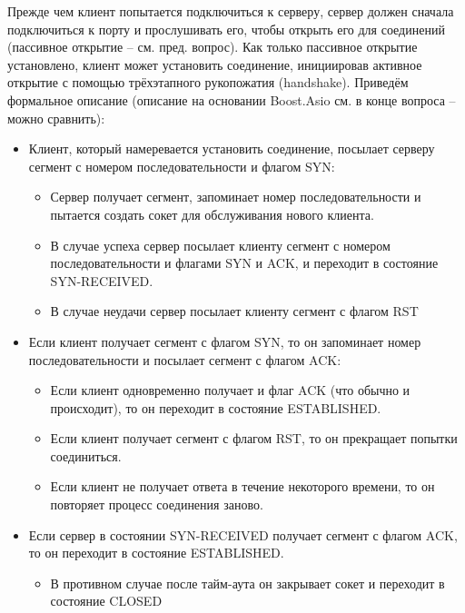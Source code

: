 \documentclass[a4paper,12pt]{article}	%
\begin{document}
	Прежде чем клиент попытается подключиться к серверу, сервер должен сначала подключиться к порту и прослушивать его, чтобы открыть его для соединений (пассивное открытие -- см. пред. вопрос). Как только пассивное открытие установлено, клиент может установить соединение, инициировав активное открытие с помощью трёхэтапного рукопожатия (handshake). Приведём формальное описание (описание на основании Boost.Asio см. в конце вопроса -- можно сравнить):
	
	\begin{itemize}
	
		\item Клиент, который намеревается установить соединение, посылает серверу сегмент с номером последовательности и флагом SYN:
		
		\begin{itemize}
		
			\item Сервер получает сегмент, запоминает номер последовательности и пытается создать сокет для обслуживания нового клиента.
			
			\item В случае успеха сервер посылает клиенту сегмент с номером последовательности и флагами SYN и ACK, и переходит в состояние SYN-RECEIVED.
			
			\item В случае неудачи сервер посылает клиенту сегмент с флагом RST
		
		\end{itemize}
		
		\item Если клиент получает сегмент с флагом SYN, то он запоминает номер последовательности и посылает сегмент с флагом ACK:
		
		\begin{itemize}
		
			\item Если клиент одновременно получает и флаг ACK (что обычно и происходит), то он переходит в состояние ESTABLISHED.
			
			\item Если клиент получает сегмент с флагом RST, то он прекращает попытки соединиться.
			
			\item Если клиент не получает ответа в течение некоторого времени, то он повторяет процесс соединения заново.
		
		\end{itemize}
		
	\item Если сервер в состоянии SYN-RECEIVED получает сегмент с флагом ACK, то он переходит в состояние ESTABLISHED.
	
		\begin{itemize}
		
			\item В противном случае после тайм-аута он закрывает сокет и переходит в состояние CLOSED
					
		\end{itemize}
	
	\end{itemize}
	
\end{document}
